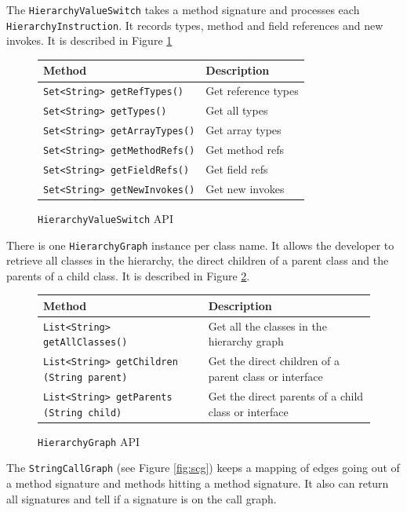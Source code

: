 \documentclass[preprint]{sigplanconf}
\begin{document}
The {\tt HierarchyValueSwitch} takes a method signature and processes each {\tt HierarchyInstruction}. It records types, method and field references and new invokes. It is described in Figure \ref{fig:hvsw}

\begin{figure}[htbf]
\begin{tabularx}{\columnwidth}{|lX|}
\hline
{\bf Method} & {\bf Description }\\\hline
{\tt Set<String> getRefTypes()} &  Get reference types\\\hline
{\tt Set<String> getTypes()} &  Get all types\\\hline
{\tt Set<String> getArrayTypes()} &  Get array types\\\hline
{\tt Set<String> getMethodRefs()} &  Get method refs\\\hline
{\tt Set<String> getFieldRefs()} &  Get field refs\\\hline
{\tt Set<String> getNewInvokes()} &  Get new invokes\\\hline
\end{tabularx}
\caption{{\tt HierarchyValueSwitch} API}
\label{fig:hvsw}
\end{figure}

There is one {\tt HierarchyGraph} instance per class name. It allows the developer to retrieve all classes in the hierarchy, the direct children of a parent class and the parents of a child class. It is described in Figure \ref{fig:hg}.

\begin{figure}[htbf]
\begin{tabularx}{\columnwidth}{|XX|}
\hline
{\bf Method} & {\bf Description }\\\hline
{\tt List<String> getAllClasses()} &  Get all the classes in the 
    hierarchy graph\\\hline
{\tt List<String> getChildren (String parent)} &  Get the direct 
    children of a parent class or interface\\\hline
{\tt List<String> getParents (String child)} &  Get the direct
    parents of a child class or interface\\\hline
\end{tabularx}
\caption{{\tt HierarchyGraph} API}
\label{fig:hg}
\end{figure}

The {\tt StringCallGraph} (see Figure \ref{fig:scg}) keeps a mapping of edges going out of a method signature and methods hitting a method signature. It also can return all signatures and tell if a signature is on the call graph.
\end{document}
